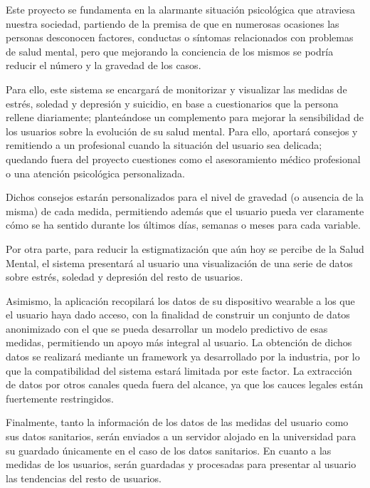         Este proyecto se fundamenta en la alarmante situación psicológica que atraviesa nuestra sociedad, partiendo de la premisa de que en numerosas ocasiones las personas desconocen factores, conductas o síntomas relacionados con problemas de salud mental, pero que mejorando la conciencia de los mismos se podría reducir el número y la gravedad de los casos.

        Para ello, este sistema se encargará de monitorizar y visualizar las medidas de estrés, soledad y depresión y suicidio, en base a cuestionarios que la persona rellene diariamente; planteándose un complemento para mejorar la sensibilidad de los usuarios sobre la evolución de su salud mental. Para ello, aportará consejos y remitiendo a un profesional cuando la situación del usuario sea delicada; quedando fuera del proyecto cuestiones como el asesoramiento médico profesional o una atención psicológica personalizada.

        Dichos consejos estarán personalizados para el nivel de gravedad (o ausencia de la misma) de cada medida, permitiendo además que el usuario pueda ver claramente cómo se ha sentido durante los últimos días, semanas o meses para cada variable.
        

        Por otra parte, para reducir la estigmatización que aún hoy se percibe de la Salud Mental, el sistema presentará al usuario una visualización de una serie de datos sobre estrés, soledad y depresión del resto de usuarios.

        Asimismo, la aplicación recopilará los datos de su dispositivo \gls{wearable} a los que el usuario haya dado acceso, con la finalidad de construir un conjunto de datos anonimizado con el que se pueda desarrollar un modelo predictivo de esas medidas, permitiendo un apoyo más integral al usuario. La obtención de dichos datos se realizará mediante un \gls{framework} ya desarrollado por la industria, por lo que la compatibilidad del sistema estará limitada por este factor. La extracción de datos por otros canales queda fuera del alcance, ya que los cauces legales están fuertemente restringidos. 

        Finalmente, tanto la información de los datos de las medidas del usuario como sus datos sanitarios, serán enviados a un servidor alojado en la universidad para su guardado únicamente en el caso de los datos sanitarios. En cuanto a las medidas de los usuarios, serán guardadas y procesadas para presentar al usuario las tendencias del resto de usuarios.

